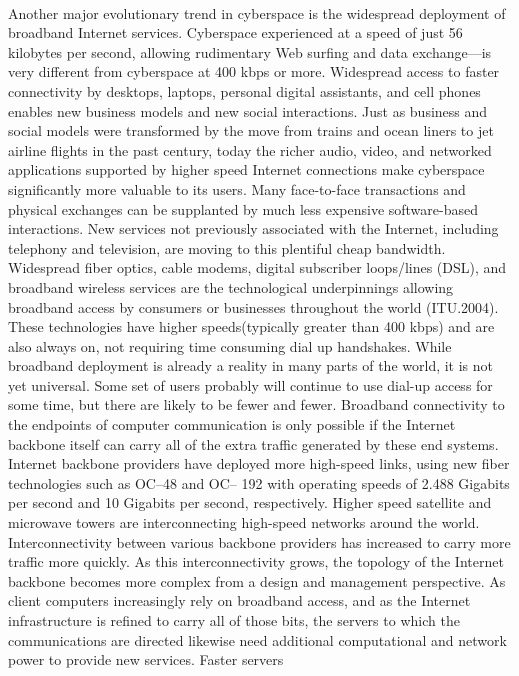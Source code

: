 \documentclass[11pt,a4paper]{article}
\begin{document}
\\
	Another major evolutionary trend in cyberspace is the widespread deployment of broadband Internet services. Cyberspace experienced at a speed of just 56 kilobytes per second, allowing rudimentary Web surfing and data exchange—is very different from cyberspace at 400 kbps or more. Widespread access to faster connectivity by desktops, laptops, personal digital assistants, and cell phones enables new business models and new social interactions. Just as business and social models were transformed by the move from trains and ocean liners to jet airline flights in the past century, today the richer audio, video, and networked
applications supported by higher speed Internet connections make cyberspace significantly more valuable to its users. Many face-to-face transactions and
physical exchanges can be supplanted by much less expensive software-based interactions. New services not previously associated with the Internet, including
telephony and television, are moving to this plentiful cheap bandwidth. Widespread fiber optics, cable modems, digital subscriber loops/lines (DSL), and
broadband wireless services are the technological underpinnings allowing broadband access by consumers or businesses throughout the world (ITU.2004). These technologies have higher speeds(typically greater than 400 kbps) and are also always on, not requiring time consuming dial up handshakes. While broadband deployment is already a reality in many parts of the world, it is not yet universal. Some set of users probably will continue to use dial-up access
for some time, but there are likely to be fewer and fewer. Broadband connectivity to the endpoints of computer communication is only possible if the Internet
backbone itself can carry all of the extra traffic generated by these end systems. Internet backbone providers have deployed more high-speed links, using
new fiber technologies such as OC–48 and OC– 192 with operating speeds of 2.488 Gigabits per second and 10 Gigabits per second, respectively. Higher speed satellite and microwave towers are interconnecting high-speed networks around the
world. Interconnectivity between various backbone providers has increased to carry more traffic more quickly. As this interconnectivity grows, the topology
of the Internet backbone becomes more complex from a design and management perspective. As client computers increasingly rely on broadband access, and
as the Internet infrastructure is refined to carry all of those bits, the servers to which the communications are directed likewise need additional computational and network power to provide new services. Faster servers
\end{document}
